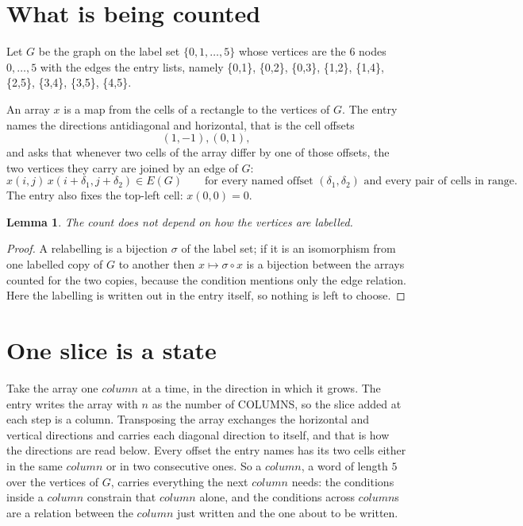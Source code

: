 \documentclass[11pt,a4paper]{article}
\theoremstyle{plain}
\newtheorem{lemma}[theorem]{Lemma}
\theoremstyle{definition}
\begin{document}
\section{What is being counted}

Let $G$ be the graph on the label set $\{0,1,\dots,5\}$ whose vertices are the $6$ nodes $0,\dots,5$ with the edges the entry lists, namely \{0,1\}, \{0,2\}, \{0,3\}, \{1,2\}, \{1,4\}, \{2,5\}, \{3,4\}, \{3,5\}, \{4,5\}.

An array $x$ is a map from the cells of a rectangle to the vertices of $G$. The entry names the
directions antidiagonal and horizontal, that is the cell offsets
\[
(1,-1), (0,1),
\]
and asks that whenever two cells of the array differ by one of those offsets, the two vertices
they carry are joined by an edge of $G$:
\[
x(i,j)\,x(i+\delta_1,j+\delta_2)\in E(G)\qquad
\text{for every named offset } (\delta_1,\delta_2)\text{ and every pair of cells in range.}
\]
The entry also fixes the top-left cell: $x(0,0)=0$.

\begin{lemma}\label{lem:label}
The count does not depend on how the vertices are labelled.
\end{lemma}

\begin{proof}
A relabelling is a bijection $\sigma$ of the label set; if it is an isomorphism from one
labelled copy of $G$ to another then $x\mapsto\sigma\circ x$ is a bijection between the arrays
counted for the two copies, because the condition mentions only the edge relation.
Here the labelling is written out in the entry itself, so nothing is left to choose.
\end{proof}

\section{One slice is a state}

Take the array one $column$ at a time, in the direction in which it grows. The entry writes the array with $n$ as the number of COLUMNS, so the slice added at each step is a column. Transposing the array exchanges the horizontal and vertical directions and carries each diagonal direction to itself, and that is how the directions are read below.
Every offset the entry names has its two cells either in the same $column$ or in two
consecutive ones. So a $column$, a word of length $5$ over the vertices of $G$, carries
everything the next $column$ needs: the conditions inside a $column$ constrain that
$column$ alone, and the conditions across $column$s are a relation between the
$column$ just written and the one about to be written.
\end{document}
